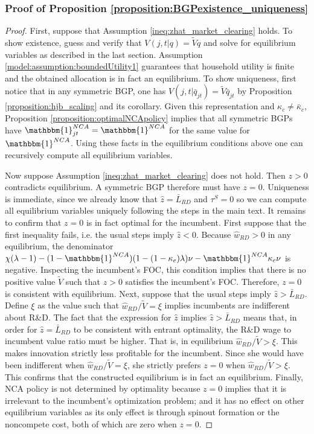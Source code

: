\documentclass[ecta,nameyear,final]{econsocart}
\theoremstyle{definition}
\begin{document}
\subsubsection{Proof of Proposition \ref{proposition:BGPexistence_uniqueness}}\label{appendix:proofs:proposition:BGPexistence_uniqueness}

\begin{proof}
	First, suppose that Assumption \ref{ineq:zhat_market_clearing} holds. To show existence, guess and verify that $V(j,t|q) = \tilde{V} q$ and solve for equilibrium variables as described in the last section. Assumption \ref{model:assumption:boundedUtility1} guarantees that household utility is finite and the obtained allocation is in fact an equilibrium. To show uniqueness, first notice that in any symmetric BGP, one has $V(j,t|\bar{q}_{jt}) = \tilde{V}\bar{q}_{jt}$ by Proposition \ref{proposition:hjb_scaling} and its corollary. Given this representation and $\kappa_c \ne \bar{\kappa}_c$, Proposition \ref{proposition:optimalNCApolicy} implies that all symmetric BGPs have $\mathbbm{1}^{NCA}_{jt} = \mathbbm{1}^{NCA}$ for the same value for $\mathbbm{1}^{NCA}$. Using these facts in the equilibrium conditions above one can recursively compute all equilibrium variables.
	
	Now suppose Assumption \ref{ineq:zhat_market_clearing} does not hold. Then $z > 0$ contradicts equilibrium. A symmetric BGP therefore must have $z = 0$. Uniqueness is immediate, since we already know that $\hat{z} = \bar{L}_{RD}$ and $\tau^S = 0$ so we can compute all equilibrium variables uniquely following the steps in the main text. It remains to confirm that $z = 0$ is in fact optimal for the incumbent. First suppose that the first inequality fails, i.e. the usual steps imply $\hat{z} < 0$. Because $\hat{w}_{RD} > 0$ in any equilibrium, the denominator $\chi(\lambda -1) - (1 - \mathbbm{1}^{NCA})(1 - (1-\kappa_e) \lambda) \nu - \mathbbm{1}^{NCA} \kappa_c \nu $ is negative. Inspecting the incumbent's FOC, this condition implies that there is no positive value $\tilde{V}$ such that $z > 0$ satisfies the incumbent's FOC. Therefore, $z = 0$ is consistent with equilibrium. Next, suppose that the usual steps imply $\hat{z} > \bar{L}_{RD}$. Define $\xi$ as the value such that $\hat{w}_{RD} / \tilde{V} = \xi$ implies incumbents are indifferent about R\&D. The fact that the expression for $\hat{z}$ implies $\hat{z} > \bar{L}_{RD}$ means that, in order for $\hat{z} = \bar{L}_{RD}$ to be consistent with entrant optimality, the R\&D wage to incumbent value ratio must be higher. That is, in equilibrium $\hat{w}_{RD} / \tilde{V} > \xi$. This makes innovation strictly less profitable for the incumbent. Since she would have been indifferent when $\hat{w}_{RD} / \tilde{V} = \xi$, she strictly prefers $z = 0$ when $\hat{w}_{RD} / \tilde{V}> \xi$. This confirms that the constructed equilibrium is in fact an equilibrium. Finally, NCA policy is not determined by optimality because $z = 0$ implies that it is irrelevant to the incumbent's optimization problem; and it has no effect on other equilibrium variables as its only effect is through spinout formation or the noncompete cost, both of which are zero when $z = 0$.
\end{proof}
\end{document}
